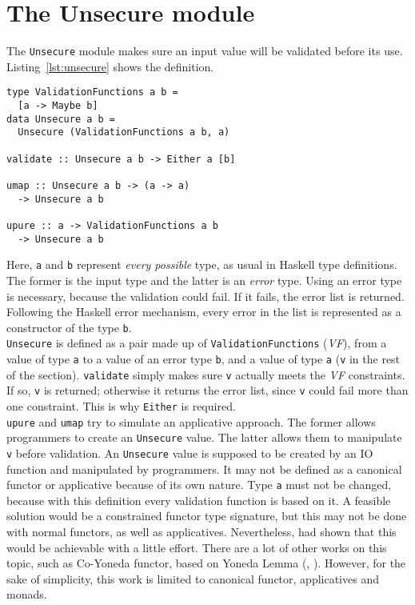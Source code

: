 \section{The Unsecure module}\label{sec:unsecure}
The \texttt{Unsecure} module makes sure an input value will be validated before its use. Listing~\ref{lst:unsecure} shows the definition.

\begin{lstlisting}[caption={Unsecure module}, label={lst:unsecure}]
type ValidationFunctions a b =
  [a -> Maybe b]
data Unsecure a b =  
  Unsecure (ValidationFunctions a b, a)
 
validate :: Unsecure a b -> Either a [b]

umap :: Unsecure a b -> (a -> a) 
  -> Unsecure a b

upure :: a -> ValidationFunctions a b
  -> Unsecure a b
\end{lstlisting}
Here, \texttt{a} and \texttt{b} represent \textit{every possible} type, as usual in Haskell type definitions. The former is the input type and the latter is an \textit{error} type. Using an error type is necessary, because the validation could fail. If it fails, the error list is returned. Following the Haskell error mechanism, every error in the list is represented as a constructor of the type \texttt{b}. \\
\texttt{Unsecure} is defined as a pair made up of \texttt{ValidationFunctions} (\textit{VF}), from a value of type \texttt{a} to a value of an error type \texttt{b}, and a value of type \texttt{a} (\texttt{v} in the rest of the section). \texttt{validate} simply makes sure \texttt{v} actually meets the \textit{VF} constraints. If so, \texttt{v} is returned; otherwise it returns the error list, since \texttt{v} could fail more than one constraint. This is why \texttt{Either} is required. \\
\texttt{upure} and \texttt{umap} try to simulate an applicative approach. The former allows programmers to create an \texttt{Unsecure} value. The latter allows them to manipulate \texttt{v} before validation. An \texttt{Unsecure} value is supposed to be created by an IO function and manipulated by programmers. It may not be defined as a canonical functor or applicative because of its own nature. Type \texttt{a} must not be changed, because with this definition every validation function is based on it. A feasible solution would be a constrained functor type signature, but this may not be done with normal functors, as well as applicatives. Nevertheless, \citeauthor{Sculthorpe:13:ConstrainedMonad} \cite{Sculthorpe:13:ConstrainedMonad} had shown that this would be achievable with a little effort. There are a lot of other works on this topic, such as Co-Yoneda functor, based on Yoneda Lemma (\cite{elkins2009calculating}, \cite{yoneda}). However, for the sake of simplicity, this work is limited to canonical functor, applicatives and monads. \\
